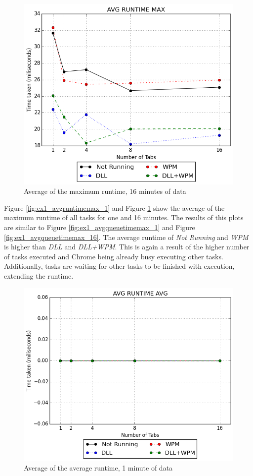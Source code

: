 \begin{figure}[!htbp]
	\centering
    \includegraphics[width=\textwidth,keepaspectratio]{Evaluation/experiment1/AVG-RUNTIME-MAX-16.png}
    \caption{Average of the maximum runtime, 16 minutes of data}
    \label{fig:ex1_avgruntimemax_16}
\end{figure}
Figure \ref{fig:ex1_avgruntimemax_1} and Figure \ref{fig:ex1_avgruntimemax_16} show the average of the maximum runtime of all tasks for one and 16 minutes. The results of this plots are similar to Figure \ref{fig:ex1_avgqueuetimemax_1} and Figure \ref{fig:ex1_avgqueuetimemax_16}. The average runtime of \emph{Not Running} and \emph{\gls{WPM}} is higher than \emph{\gls{DLL}} and \emph{\gls{DLL}+\gls{WPM}}. This is again a result of the higher number of tasks executed and Chrome being already busy executing other tasks. Additionally, tasks are waiting for other tasks to be finished with execution, extending the runtime.
\begin{figure}[!htbp]
	\centering
    \includegraphics[width=\textwidth,keepaspectratio]{Evaluation/experiment1/AVG-RUNTIME-AVG-1.png}
    \caption{Average of the average runtime, 1 minute of data}
    \label{fig:ex1_avgruntimeavg_1}
\end{figure}
